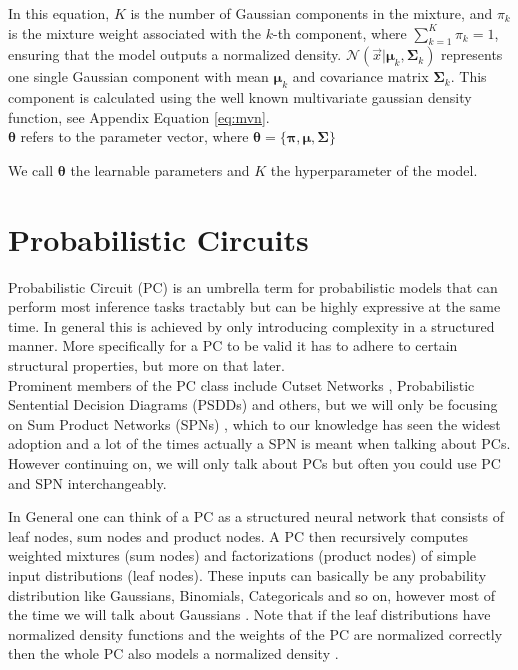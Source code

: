 In this equation, $K$ is the number of Gaussian components in the mixture, and $\pi_k$ is the mixture weight associated with the $k$-th component, where $\sum_{k=1}^K \pi_k = 1$, ensuring that the model 
outputs a normalized density. $\mathcal{N}(\vec x|\boldsymbol{\mu}_k, \boldsymbol{\Sigma}_k)$ represents one single Gaussian component with mean $\boldsymbol{\mu}_k$ and 
covariance matrix $\boldsymbol{\Sigma}_k$. This component is calculated using the well known multivariate gaussian density function, see Appendix Equation \ref{eq:mvn}.\\
$\boldsymbol{\theta}$ refers to the parameter vector, where $\boldsymbol{\theta} = \{\boldsymbol{\pi}, \boldsymbol{\mu}, \boldsymbol{\Sigma}\}$

We call $\boldsymbol{\theta}$ the learnable parameters and $K$ the hyperparameter of the model.

\section{Probabilistic Circuits}
\label{sec:pc}

Probabilistic Circuit (PC) \cite{pc_intro} is an umbrella term for probabilistic models that can perform most inference tasks tractably but can be 
highly expressive at the same time. In general this is achieved by only introducing complexity in a structured manner. More specifically
for a PC to be valid it has to adhere to certain structural properties, but more on that later. \\

Prominent members of the PC class include Cutset Networks \cite{cutset}, Probabilistic
Sentential Decision Diagrams (PSDDs) \cite{psdd} and others, but we will only be focusing on Sum Product Networks (SPNs) \cite{spn}, which to our 
knowledge has seen the widest adoption and a lot of the times actually a SPN is meant when talking about PCs. However continuing on, we will only talk about 
PCs but often you could use PC and SPN interchangeably. 

In General one can think of a PC as a structured neural network that consists of leaf nodes, sum nodes and product 
nodes. A PC then recursively computes weighted mixtures (sum nodes) and factorizations (product nodes) of simple input distributions (leaf nodes). 
These inputs can basically be any probability distribution like Gaussians, Binomials, Categoricals and so on,
however most of the time we will talk about Gaussians \cite{pc_intro}. Note that if the leaf distributions have normalized density functions and the weights of the PC are
normalized correctly then the whole PC also models a normalized density \cite{pc_intro}.

